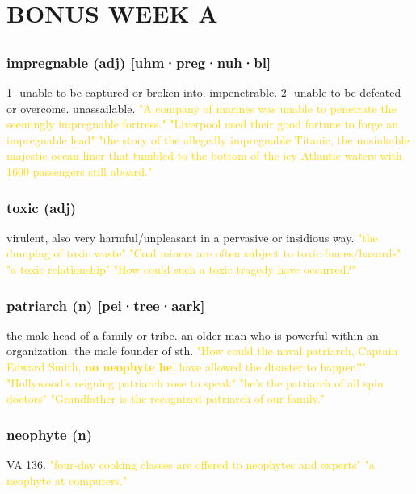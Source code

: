 \documentclass{proc}
\begin{document}
	\section{BONUS WEEK A}
	\subsection{}
	\subsubsection{\textcolor{brickred}{impregnable} (adj) [uhm·preg·nuh·bl]}
	1- unable to be captured or broken into. impenetrable. 2- unable to be defeated or overcome. unassailable.
	\textcolor{gold}{"A company of marines was unable to penetrate the seemingly impregnable fortress." "Liverpool used their good fortune to forge an impregnable lead" "the story of the allegedly impregnable Titanic, the unsinkable majestic ocean liner that tumbled to the bottom of the icy Atlantic waters with 1600 passengers still aboard."}
	
	\subsubsection{\textcolor{brickred}{toxic} (adj)}
	virulent, also very harmful/unpleasant in a pervasive or insidious way.
	\textcolor{gold}{"the dumping of toxic waste" "Coal miners are often subject to toxic fumes/hazards" "a toxic relationship" "How could such a toxic tragedy have occurred?"}
	
	\subsubsection{\textcolor{brickred}{patriarch} (n) [pei·tree·aark]}
	the male head of a family or tribe. an older man who is powerful within an organization. the male founder of sth.
	\textcolor{gold}{"How could the naval patriarch, Captain Edward Smith, \textbf{no neophyte he}, have allowed the disaster to happen?" "Hollywood's reigning patriarch rose to speak" "he's the patriarch of all spin doctors" "Grandfather is the recognized patriarch of our family."}
	
	\subsubsection{\textcolor{brickred}{neophyte} (n)}
	VA 136.
	\textcolor{gold}{"four-day cooking classes are offered to neophytes and experts" "a neophyte at computers."}
	
\end{document}
